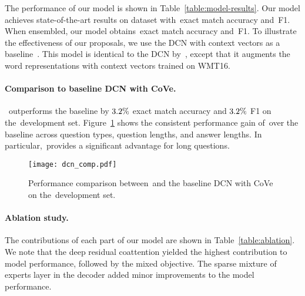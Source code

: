 \documentclass{article} %
\begin{document}
The performance of our model is shown in Table~\ref{table:model-results}.
Our model achieves state-of-the-art results on \squad dataset with~\emours exact match accuracy and~\fours F1.
When ensembled, our model obtains~\emoursensemble exact match accuracy and~\foursensemble F1.
To illustrate the effectiveness of our proposals, we use the DCN with context vectors as a baseline~\citep{McCann2017Learned}.
This model is identical to the DCN by~\citet{xiong2016dynamic}, except that it augments the word representations with context vectors trained on WMT16.


\paragraph{Comparison to baseline DCN with CoVe.}
~\modelname outperforms the baseline by $3.2\%$ exact match accuracy and $3.2\%$ F1 on the~\squad development set.
Figure~\ref{fig:dcn_comp} shows the consistent performance gain of~\modelname over the baseline across question types, question lengths, and answer lengths.
In particular,~\modelname provides a significant advantage for long questions.

\begin{figure}[!htb]
\texttt{[image: dcn\_comp.pdf]}
\caption{
  Performance comparison between~\modelname and the baseline DCN with CoVe on the~\squad development set.
}\label{fig:dcn_comp}
\vspace{-2mm}
\end{figure}



\paragraph{Ablation study.}
The contributions of each part of our model are shown in Table~\ref{table:ablation}.
We note that the deep residual coattention yielded the highest contribution to model performance, followed by the mixed objective.
The sparse mixture of experts layer in the decoder added minor improvements to the model performance.
\end{document}

